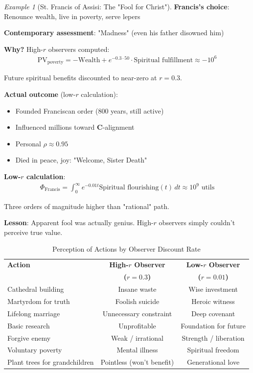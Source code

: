 \documentclass[11pt,a4paper]{article}
\theoremstyle{definition}
\theoremstyle{remark}
\newtheorem{example}{Example}[section]
\begin{document}
\begin{small}
\begin{enumerate}
\begin{example}[St. Francis of Assisi: The "Fool for Christ"]
\textbf{Francis's choice}: Renounce wealth, live in poverty, serve lepers

\textbf{Contemporary assessment}: "Madness" (even his father disowned him)

\textbf{Why?} High-\(r\) observers computed:
\begin{align}
\text{PV}_{\text{poverty}} = -\text{Wealth} + e^{-0.3 \cdot 50} \cdot \text{Spiritual fulfillment} \approx -10^6
\end{align}

Future spiritual benefits discounted to near-zero at \(r = 0.3\).

\textbf{Actual outcome} (low-\(r\) calculation):
\begin{itemize}
    \item Founded Franciscan order (800 years, still active)
    \item Influenced millions toward \(\mathbf{C}\)-alignment
    \item Personal \(\rho \approx 0.95\)
    \item Died in peace, joy: "Welcome, Sister Death"
\end{itemize}

\textbf{Low-\(r\) calculation}:
\begin{align}
\Phi_{\text{Francis}} = \int_0^\infty e^{-0.01t} \text{Spiritual flourishing}(t) \, dt \approx 10^9 \text{ utils}
\end{align}

Three orders of magnitude higher than "rational" path.

\textbf{Lesson}: Apparent fool was actually genius. High-\(r\) observers simply couldn't perceive true value.
\end{example}

\begin{table}[H]
\centering
\caption{Perception of Actions by Observer Discount Rate}
\label{tab:wisdom_foolishness}
\begin{tabular}{|l|c|c|}
\hline
\textbf{Action} & \textbf{High-\(r\) Observer} & \textbf{Low-\(r\) Observer} \\
& \textbf{(\(r=0.3\))} & \textbf{(\(r=0.01\))} \\
\hline
Cathedral building & Insane waste & Wise investment \\
\hline
Martyrdom for truth & Foolish suicide & Heroic witness \\
\hline
Lifelong marriage & Unnecessary constraint & Deep covenant \\
\hline
Basic research & Unprofitable & Foundation for future \\
\hline
Forgive enemy & Weak / irrational & Strength / liberation \\
\hline
Voluntary poverty & Mental illness & Spiritual freedom \\
\hline
Plant trees for grandchildren & Pointless (won't benefit) & Generational love \\
\hline
\end{tabular}
\end{table}


\end{enumerate}
\end{small}
\end{document}
